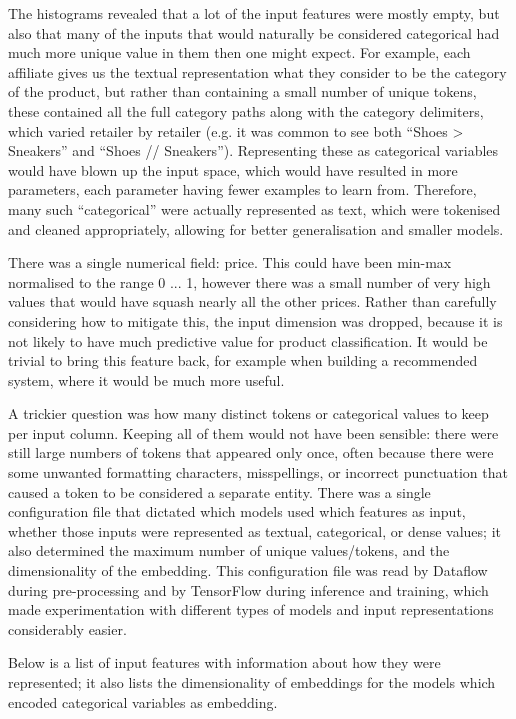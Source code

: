 The histograms revealed that a lot of the input features were mostly empty, but also that many of the inputs that would naturally be considered categorical  had much more unique value in them then one might expect.
For example, each affiliate gives us the textual representation what they consider to be the category of the product,  but  rather than containing a small number of unique tokens, these contained all the full category paths along with the category delimiters, which  varied retailer by retailer (e.g.  it was common to see both ``Shoes > Sneakers'' and ``Shoes // Sneakers'').
Representing these as categorical variables would have blown up the input space, which would have  resulted in more parameters, each parameter having fewer examples to learn from.
Therefore, many such ``categorical''  were actually represented as text, which were tokenised and cleaned appropriately, allowing for better generalisation and smaller models.

There was a single numerical field: price.
This could have been min-max normalised to the range 0 ... 1, however there  was a small number of very high values that would have squash nearly all the other  prices.
Rather than  carefully considering  how to mitigate this,  the input dimension was dropped, because it is not likely to have much predictive value for product classification.
It would be trivial to bring this feature back, for example  when building a recommended system, where it would be much more useful.

A trickier question was how many distinct tokens or categorical values to keep per input column.
Keeping all of them would not have been sensible: there were still large numbers of tokens that appeared only once, often because there were some unwanted formatting characters, misspellings, or incorrect punctuation that caused a token to be considered a separate entity.
There was a single configuration file that dictated which models used which features as input, whether those inputs were represented as textual, categorical, or dense values;  it also determined  the maximum number of unique values/tokens,  and the dimensionality of the embedding.
This configuration file was read by Dataflow during pre-processing  and by TensorFlow during  inference and training, which made experimentation with  different types of models and input representations considerably easier.

Below is a list of input features with information about how they were represented; it also lists the dimensionality of embeddings  for the models which  encoded categorical variables as embedding.

